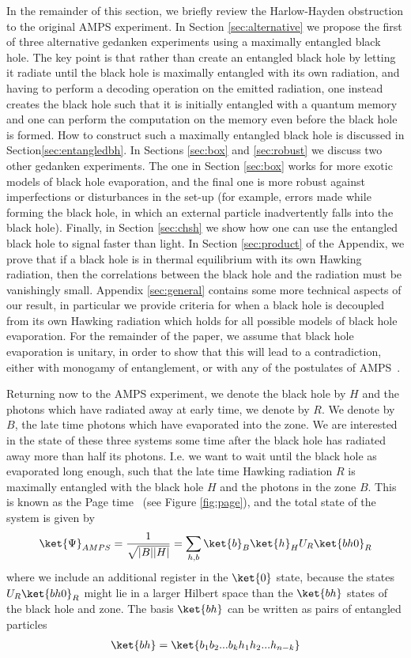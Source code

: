 \documentclass[11pt,a4paper]{article}
\begin{document}
In the remainder of this section, we briefly review the Harlow-Hayden obstruction to the original AMPS experiment. In Section \ref{sec:alternative} we propose the first of three alternative gedanken experiments using a maximally entangled black hole.  The key point is that rather than create an entangled black hole by letting it radiate until the black hole is maximally entangled with its own radiation, and having to perform a decoding operation on the emitted radiation, one instead creates the black hole such that it is initially entangled with a quantum memory and one can perform the computation on the memory even before the black hole is formed. How to construct such a maximally entangled black hole is discussed in Section\ref{sec:entangledbh}. In Sections \ref{sec:box} and \ref{sec:robust} we discuss two other gedanken experiments. The one in Section \ref{sec:box} works for more exotic models of black hole evaporation, and the final one is more robust against imperfections or disturbances in the set-up (for example, errors made while forming the black hole, in which an external particle inadvertently falls into the black hole). Finally, in Section \ref{sec:chsh} we show how one can use the entangled black hole to signal faster than light. In Section \ref{sec:product} of the Appendix, we prove that if a black hole is in thermal equilibrium with its own Hawking radiation, then the correlations between the black hole and the radiation must be vanishingly small.  Appendix \ref{sec:general} contains some more technical aspects of our result, in particular we provide criteria for when a black hole is decoupled from its own Hawking radiation which holds for all possible models of black hole evaporation. For the remainder of the paper, we assume that black hole evaporation is unitary, in order to show that this will lead to a contradiction, either with monogamy of entanglement, or with any of the postulates of AMPS~\cite{almheiri2013black}.
 
 
Returning now to the AMPS experiment, we denote the black hole by $H$ and the photons which have radiated away at early time, we denote by $R$. We denote by $B$, the late time photons which have evaporated into the zone. We are interested in the state of these three systems some time after the black hole has radiated away more than half its photons. I.e. we want to wait until the black hole as evaporated long enough, such that the late time Hawking radiation $R$ is maximally entangled with the black hole $H$ and the photons in the zone $B$. This is known as the Page time~\cite{page-unitary-evap} (see Figure \ref{fig:page}), and the total state of the system is given by
\begin{align}
\ket{\Psi}_{AMPS}=\frac{1}{\sqrt{|B||H|}}
=\sum_{h,b}\ket{b}_B\ket{h}_H U_R\ket{bh0}_{R}
\label{eq:hh}
\end{align}
where we include an additional register in the $\ket{0}$ state, because the states $U_R\ket{bh0}_{R}$ might lie in a larger Hilbert space than the $\ket{bh}$ states of the black hole and zone. The basis $\ket{bh}$ can be written as pairs of entangled particles 
\begin{align}
\ket{bh}=\ket{b_1b_2...b_kh_1h_2...h_{n-k}}
\end{align}
\end{document}

